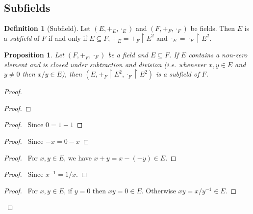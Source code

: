 \documentclass{article}
\let\qed\relax
\newtheorem{proposition}[axiom]{Proposition}
\theoremstyle{definition}
\newtheorem{definition}[axiom]{Definition}
\newcommand{\inv}[1]{\ensuremath{{#1}^{-1}}}
\begin{document}
    \subsection{Subfields}

    \begin{definition}[Subfield]
        Let $(E, +_E, \cdot_E)$ and $(F, +_F, \cdot_F)$ be fields. Then $E$ is a \emph{subfield} of $F$
        if and only if $E \subseteq F$, $+_E = +_F \restriction E^2$ and $\cdot_E = \cdot_F \restriction E^2$.
    \end{definition}

    \begin{proposition}
        Let $(F, +_F, \cdot_F)$ be a field and $E \subseteq F$. If $E$ contains a non-zero element and
        is closed under subtraction and division (i.e. whenever $x,y \in E$ and $y \neq 0$ then $x/y \in E$),
        then $(E, +_F \restriction E^2, \cdot_F \restriction E^2)$ is a subfield of $F$.
    \end{proposition}

    \begin{proof}
        \pf
        \begin{proof}
        \end{proof}
        \begin{proof}
            \pf\ Since $0 = 1 - 1$
        \end{proof}
        \begin{proof}
            \pf\ Since $-x = 0 - x$
        \end{proof}
        \begin{proof}
            \pf\ For $x,y \in E$, we have $x+y = x - (-y) \in E$.
        \end{proof}
        \step{5}{$\forall x \in E - \{0\}. \inv{x} \in E$}
        \begin{proof}
            \pf\ Since $\inv{x} = 1 / x$.
        \end{proof}
        \begin{proof}
            \pf\ For $x,y \in E$, if $y = 0$ then $xy = 0 \in E$. Otherwise $xy = x / \inv{y} \in E$.
        \end{proof}
        \qed
    \end{proof}
\end{document}
